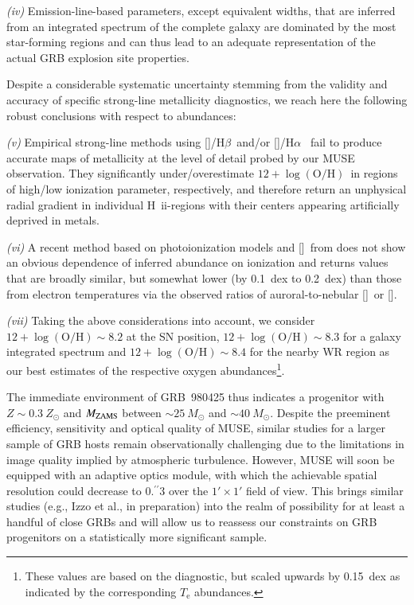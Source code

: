 \documentclass[traditabstract, referee]{aa}
\newcommand{\farc}{\hbox{$.\!\!^{\prime\prime}$}}
\newcommand{\hb}{H$\beta$}
\newcommand{\ha}{H$\alpha$}
\newcommand{\hii}{\mbox{H~{\sc ii}}}
\newcommand{\oh}{12+\log(\mathrm{O/H})}
\newcommand{\sii}{[\ion{S}{ii}]}
\newcommand{\siii}{[\ion{S}{iii}]}
\newcommand{\oiii}{[\ion{O}{iii}]}
\newcommand{\nii}{[\ion{N}{ii}]}
\begin{document}
\textit{(iv)} Emission-line-based parameters, except equivalent widths, that are inferred from an integrated spectrum of the complete galaxy are dominated by the most star-forming regions and can thus lead to an adequate representation of the actual GRB explosion site properties.

Despite a considerable systematic uncertainty stemming from the validity and accuracy of specific strong-line metallicity diagnostics, we reach here the following robust conclusions with respect to abundances:

\textit{(v)} Empirical strong-line methods using \oiii/\hb~and/or \nii/\ha~ fail to produce accurate maps of metallicity at the level of detail probed by our MUSE observation. They significantly under/overestimate $\oh$~in regions of high/low ionization parameter, respectively, and therefore return an unphysical radial gradient in individual \hii-regions with their centers appearing artificially deprived in metals.

\textit{(vi)} A recent method based on photoionization models and \sii~from \citet{2016Ap&SS.361...61D} does not show an obvious dependence of inferred abundance on ionization and returns values that are broadly similar, but somewhat lower (by 0.1~dex to 0.2~dex) than those from electron temperatures via the observed ratios of auroral-to-nebular \siii~or \oiii. 

\textit{(vii)} Taking the {above} considerations into account, we consider {$\oh\sim8.2$} at the SN position, $\oh\sim8.3$ for a galaxy integrated spectrum and $\oh\sim8.4$ for the nearby WR region as our best estimates of the respective oxygen abundances\footnote{{These values are based on the \citet{2016Ap&SS.361...61D} diagnostic, but scaled upwards by 0.15~dex as indicated by the corresponding $T_{\mathrm{e}}$ abundances.}}.

The immediate environment of GRB~980425 thus indicates a progenitor with $Z\sim0.3~Z_\odot$ and $M_{\rm{ZAMS}}$ between $\sim25~M_{\odot}$ and $\sim40~M_{\odot}$. Despite the preeminent efficiency, sensitivity and optical quality of MUSE, similar studies for a larger sample of GRB hosts remain observationally challenging due to the limitations in image quality implied by atmospheric turbulence. However, MUSE will soon be equipped with an adaptive optics module, with which the achievable spatial resolution could decrease to 0\farc{3} over the $1'\times1'$ field of view. This brings similar studies {(e.g., Izzo et al., in preparation)} into the realm of possibility for at least a handful of close GRBs and will allow us to reassess our constraints on GRB progenitors on a statistically more significant sample.
\end{document}
